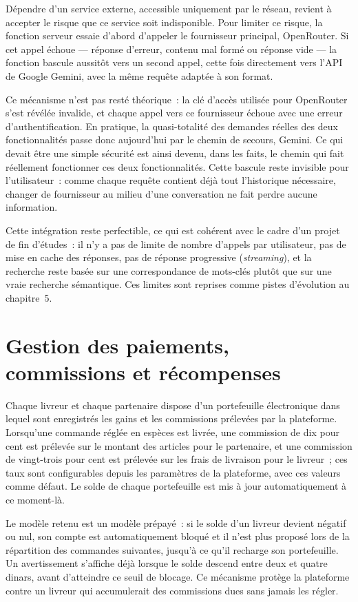 \documentclass[12pt,fleqn,a4paper]{report}
\begin{document}
\begin{justify}
Dépendre d'un service externe, accessible uniquement par le réseau, revient à accepter le risque que ce service soit indisponible. Pour limiter ce risque, la fonction serveur essaie d'abord d'appeler le fournisseur principal, OpenRouter. Si cet appel échoue — réponse d'erreur, contenu mal formé ou réponse vide — la fonction bascule aussitôt vers un second appel, cette fois directement vers l'API de Google Gemini, avec la même requête adaptée à son format.

Ce mécanisme n'est pas resté théorique~: la clé d'accès utilisée pour OpenRouter s'est révélée invalide, et chaque appel vers ce fournisseur échoue avec une erreur d'authentification. En pratique, la quasi-totalité des demandes réelles des deux fonctionnalités passe donc aujourd'hui par le chemin de secours, Gemini. Ce qui devait être une simple sécurité est ainsi devenu, dans les faits, le chemin qui fait réellement fonctionner ces deux fonctionnalités. Cette bascule reste invisible pour l'utilisateur~: comme chaque requête contient déjà tout l'historique nécessaire, changer de fournisseur au milieu d'une conversation ne fait perdre aucune information.

Cette intégration reste perfectible, ce qui est cohérent avec le cadre d'un projet de fin d'études~: il n'y a pas de limite de nombre d'appels par utilisateur, pas de mise en cache des réponses, pas de réponse progressive (\textit{streaming}), et la recherche reste basée sur une correspondance de mots-clés plutôt que sur une vraie recherche sémantique. Ces limites sont reprises comme pistes d'évolution au chapitre~5.

\section{Gestion des paiements, commissions et récompenses}

Chaque livreur et chaque partenaire dispose d'un portefeuille électronique dans lequel sont enregistrés les gains et les commissions prélevées par la plateforme. Lorsqu'une commande réglée en espèces est livrée, une commission de dix pour cent est prélevée sur le montant des articles pour le partenaire, et une commission de vingt-trois pour cent est prélevée sur les frais de livraison pour le livreur~; ces taux sont configurables depuis les paramètres de la plateforme, avec ces valeurs comme défaut. Le solde de chaque portefeuille est mis à jour automatiquement à ce moment-là.

Le modèle retenu est un modèle prépayé~: si le solde d'un livreur devient négatif ou nul, son compte est automatiquement bloqué et il n'est plus proposé lors de la répartition des commandes suivantes, jusqu'à ce qu'il recharge son portefeuille. Un avertissement s'affiche déjà lorsque le solde descend entre deux et quatre dinars, avant d'atteindre ce seuil de blocage. Ce mécanisme protège la plateforme contre un livreur qui accumulerait des commissions dues sans jamais les régler.


\end{justify}
\end{document}

